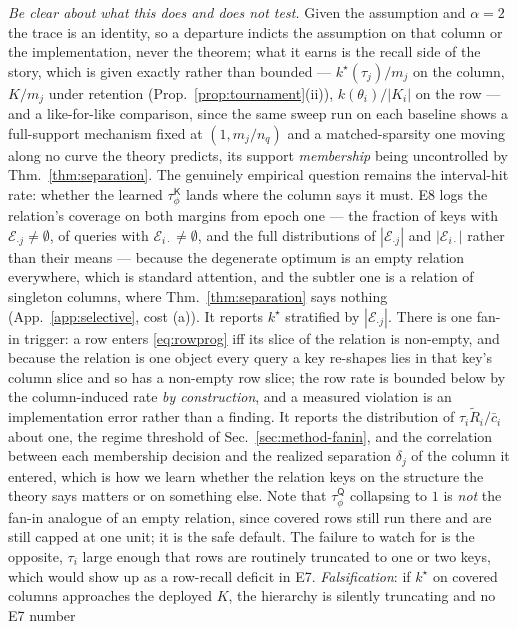 \documentclass{article}
\newcommand{\tauK}{\tau^{\mathsf{K}}_\phi}
\newcommand{\tauQ}{\tau^{\mathsf{Q}}_\phi}
\begin{document}
\emph{Be clear about what this does and does not test.} Given the assumption and $\alpha=2$ the
trace is an identity, so a departure indicts the assumption on that column or the
implementation, never the theorem; what it earns is the recall side of the story, which is given
exactly rather than bounded --- $k^\star(\tau_j)/m_j$ on the column, $K/m_j$ under retention
(Prop.~\ref{prop:tournament}(ii)), $k(\theta_i)/|K_i|$ on the row --- and a like-for-like
comparison, since the same sweep run on each baseline shows a full-support mechanism fixed at
$(1,m_j/n_q)$ and a matched-sparsity one moving along no curve the theory predicts, its support
\emph{membership} being uncontrolled by Thm.~\ref{thm:separation}. The genuinely empirical
question remains the interval-hit rate: whether the learned $\tauK$ lands where the column says
it must. E8 logs the relation's coverage on both margins from epoch one --- the fraction of keys with
$\mathcal{E}_{\cdot j}\ne\emptyset$, of queries with $\mathcal{E}_{i\cdot}\ne\emptyset$, and the
full distributions of $|\mathcal{E}_{\cdot j}|$ and $|\mathcal{E}_{i\cdot}|$ rather than their
means --- because the degenerate optimum is an empty relation everywhere, which is standard
attention, and the subtler one is a relation of singleton columns, where
Thm.~\ref{thm:separation} says nothing (App.~\ref{app:selective}, cost (a)). It reports
$k^\star$ stratified by $|\mathcal{E}_{\cdot j}|$. There is one fan-in trigger: a row enters
\eqref{eq:rowprog} iff its slice of the relation is non-empty, and because the relation is one
object every query a key re-shapes lies in that key's column slice and so has a non-empty row
slice; the row rate is bounded below by the column-induced rate \emph{by construction}, and a
measured violation is an implementation error rather than a finding. It reports the
distribution of $\tau_i\tilde R_i/\bar c_i$ about one, the regime threshold of
Sec.~\ref{sec:method-fanin}, and the correlation between each membership decision and the
realized separation $\delta_j$ of the column it entered, which is how we learn whether the
relation keys on the structure the theory says matters or on something else. Note that $\tauQ$
collapsing to $1$ is \emph{not} the fan-in analogue of an empty relation, since covered rows
still run there and are still capped at one unit; it is the safe default. The failure to watch for is the opposite, $\tau_i$ large enough that rows
are routinely truncated to one or two keys, which would show up as a row-recall deficit in E7. \emph{Falsification}: if $k^\star$ on
covered columns approaches the deployed $K$, the hierarchy is silently truncating and no E7 number
\end{document}
